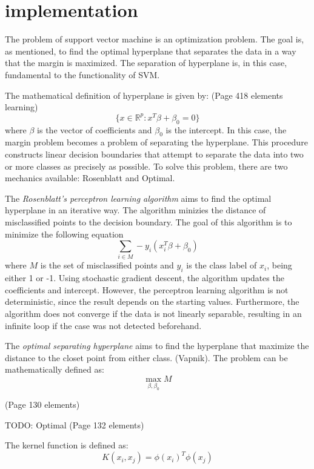 \section{implementation}
The problem of support vector machine is an optimization problem. The goal is, as mentioned, 
to find the optimal hyperplane that separates the data in a way that the margin is maximized.
The separation of hyperplane is, in this case, fundamental to the functionality of SVM.



The mathematical definition of hyperplane is given by: (Page 418 elements learning)
\begin{equation}
    \{x \in \mathbb{R}^p: x^T \beta + \beta_0 = 0\}
\end{equation}
where $\beta$ is the vector of coefficients and $\beta_0$ is the intercept.
In this case, the margin problem becomes a problem of separating the hyperplane. This procedure constructs linear decision
boundaries that attempt to separate the data into two or more classes as precisely as possible. To solve this problem,
there are two mechanics available: Rosenblatt and Optimal.

The \emph{Rosenblatt's perceptron learning algorithm} aims to find the optimal hyperplane in an iterative way. The algorithm minizies
the distance of misclassified points to the decision boundary. The goal of this algorithm is to minimize the following equation
\begin{equation}
    \sum_{i\in M} -y_i(x_i^T \beta + \beta_0)
\end{equation}
where $M$ is the set of misclassified points and $y_i$ is the class label of $x_i$, being either 1 or -1. Using stochastic gradient
descent, the algorithm updates the coefficients and intercept. However, the perceptron learning algorithm is not deterministic, since
the result depends on the starting values. Furthermore, the algorithm does not converge if the data is not linearly separable, resulting
in an infinite loop if the case was not detected beforehand.

The \emph{optimal separating hyperplane} aims to find the hyperplane that maximize the distance to the closet point from either class. 
(Vapnik). The problem can be mathematically defined as:
\begin{equation}
    \max_{\beta, \beta_0} M
\end{equation}


(Page 130 elements)


TODO: Optimal (Page 132 elements)


The kernel function is defined as:
\begin{equation}
    K(x_i, x_j) = \phi(x_i)^T \phi(x_j)
\end{equation}
